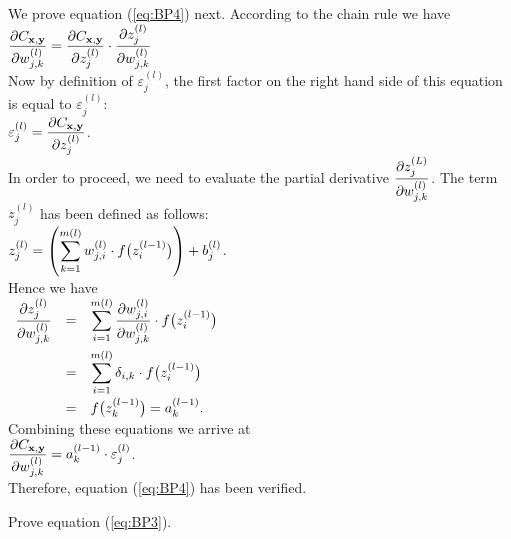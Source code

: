 We prove equation (\ref{eq:BP4}) next.  
According to the chain rule we have
\\[0.2cm]
\hspace*{1.3cm}
$ \displaystyle\frac{\partial C_{\mathbf{x}, \mathbf{y}}}{\partial w_{j,k}^{(l)}}  =  
  \frac{\partial C_{\mathbf{x}, \mathbf{y}}}{\partial z_j^{(l)}} \cdot \frac{\partial z_j^{(l)}}{\partial w_{j,k}^{(l)}} 
$ 
\\[0.2cm]
Now by definition of $\varepsilon_j^{(l)}$, the first factor on the right hand side of this equation is equal to $\varepsilon_j^{(l)}$: 
\\[0.2cm]
\hspace*{1.3cm}
$\displaystyle \varepsilon_j^{(l)} = \frac{\partial C_{\mathbf{x}, \mathbf{y}}}{\partial z_j^{(l)}}$.
\\[0.0cm]
In order to proceed, we need to evaluate the partial derivative
$\displaystyle\frac{\partial z_j^{(L)}}{\partial w_{j,k}^{(l)}}$.  The term $z_j^{(l)}$ has been defined as follows:
\\[0.2cm]
\hspace*{1.3cm}
$\displaystyle z_j^{(l)} = \left(\sum\limits_{k=1}^{m(l)} w_{j,i}^{(l)} \cdot f\bigl(z_i^{(l-1)}\bigr)\right) + b_j^{(l)}$.
\\[0.2cm]
Hence we have
\\[0.2cm]
\hspace*{1.3cm}
$
\begin{array}[t]{lcl}
        \displaystyle\frac{\partial z_j^{(l)}}{\partial w_{j,k}^{(l)}}
  & = & \displaystyle\sum\limits_{i=1}^{m(l)} \frac{\partial w_{j,i}^{(l)}}{\partial w_{j,k}^{(l)}} \cdot f\bigl(z_i^{(l-1)}\bigr) \\[0.5cm]
  & = & \displaystyle\sum\limits_{i=1}^{m(l)} \delta_{i,k}\cdot f\bigl(z_i^{(l-1)}\bigr) \\[0.4cm]
  & = & f\bigl(z_k^{(l-1)}\bigr) = a_k^{(l-1)}.
\end{array}
$
\\[0.2cm]
Combining these equations we arrive at
\\[0.2cm]
\hspace*{1.3cm}
$ \displaystyle\frac{\partial C_{\mathbf{x}, \mathbf{y}}}{\partial w_{j,k}^{(l)}}  =  
  a_k^{(l-1)} \cdot \varepsilon_j^{(l)} 
$. 
\\[0.2cm]
Therefore, equation (\ref{eq:BP4}) has been verified.

\exercise
Prove equation (\ref{eq:BP3}).
\eoxs


